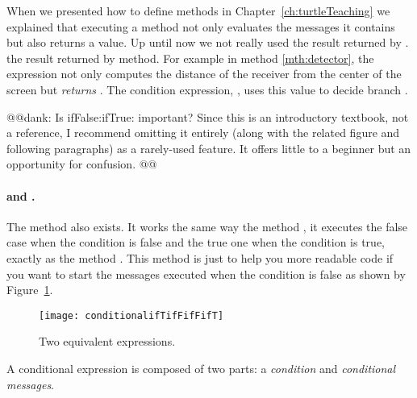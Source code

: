 {When we presented how to define methods in Chapter~\ref{ch:turtleTeaching} we explained that executing a method not only evaluates the messages it contains\add{,} but also returns a value. 
Up until now we  not really used the result returned by .  the result returned by  method. For example in method \ref{mth:detector}, the expression   not only computes the distance of the receiver from the center of the screen but  \textit{returns} .  The condition expression, , uses this value to decide  branch . 

@@dank: Is ifFalse:ifTrue: important? Since this is an introductory textbook, not a reference, I recommend omitting it entirely (along with the related figure and following paragraphs) as a rarely-used feature. It offers little to a beginner but an opportunity for confusion. @@
\paragraph{ and .}
The method  also exists. It works the same way the method , \ie it executes the false case when the condition is false and the true one when the condition is true, exactly as the method . This method is just  to help you  more readable code if you want to start  the messages executed when the condition is false as shown by Figure~\ref{fig:conditionalifTifFifFifT}.


\begin{figure}[h]
\begin{center}\texttt{[image: conditionalifTifFifFifT]}
\caption{Two equivalent  expressions.\label{fig:conditionalifTifFifFifT}}\end{center}
\end{figure}




A conditional expression is composed of two parts: a \textit{condition} and  \textit{conditional messages}. 

}
